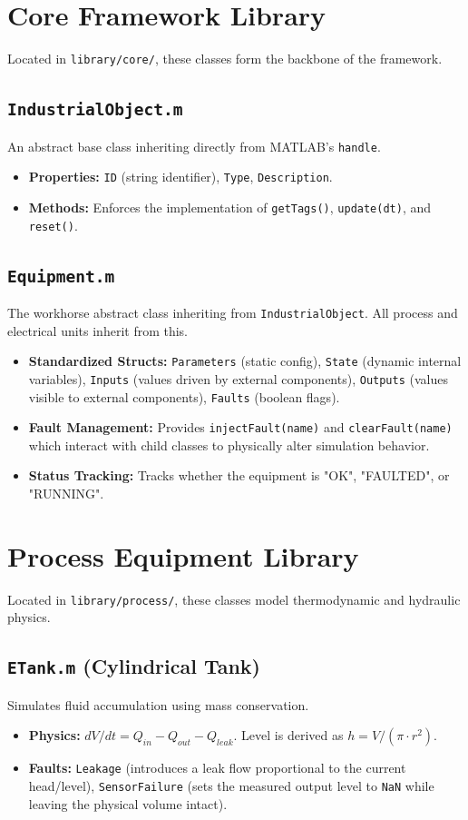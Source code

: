 \documentclass[11pt,a4paper]{report}
\begin{document}
\chapter{Core Framework Library}
Located in \texttt{library/core/}, these classes form the backbone of the framework.

\section{\texttt{IndustrialObject.m}}
An abstract base class inheriting directly from MATLAB's \texttt{handle}.
\begin{itemize}
    \item \textbf{Properties:} \texttt{ID} (string identifier), \texttt{Type}, \texttt{Description}.
    \item \textbf{Methods:} Enforces the implementation of \texttt{getTags()}, \texttt{update(dt)}, and \texttt{reset()}.
\end{itemize}

\section{\texttt{Equipment.m}}
The workhorse abstract class inheriting from \texttt{IndustrialObject}. All process and electrical units inherit from this.
\begin{itemize}
    \item \textbf{Standardized Structs:} \texttt{Parameters} (static config), \texttt{State} (dynamic internal variables), \texttt{Inputs} (values driven by external components), \texttt{Outputs} (values visible to external components), \texttt{Faults} (boolean flags).
    \item \textbf{Fault Management:} Provides \texttt{injectFault(name)} and \texttt{clearFault(name)} which interact with child classes to physically alter simulation behavior.
    \item \textbf{Status Tracking:} Tracks whether the equipment is "OK", "FAULTED", or "RUNNING".
\end{itemize}

\chapter{Process Equipment Library}
Located in \texttt{library/process/}, these classes model thermodynamic and hydraulic physics.

\section{\texttt{ETank.m} (Cylindrical Tank)}
Simulates fluid accumulation using mass conservation.
\begin{itemize}
    \item \textbf{Physics:} $dV/dt = Q_{in} - Q_{out} - Q_{leak}$. Level is derived as $h = V / (\pi \cdot r^2)$.
    \item \textbf{Faults:} \texttt{Leakage} (introduces a leak flow proportional to the current head/level), \texttt{SensorFailure} (sets the measured output level to \texttt{NaN} while leaving the physical volume intact).
\end{itemize}
\end{document}
